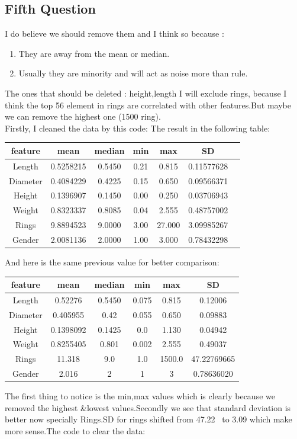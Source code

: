 \documentclass{article}
\begin{document}
\begin{multicols*}{2}
{\centering \section*{Fifth Question}}
I do believe we should remove them and I think so because :
\begin{enumerate}
	\item They are away from the mean or median.
	\item Usually they are minority and will act as noise more than rule.
\end{enumerate}
The ones that should be deleted : height,length I will exclude rings, because I think the top 56 element in rings are correlated with other features.But maybe we can remove the highest one (1500 ring).\\
Firstly, I cleaned the data by this code:
The result in the following table:\\
\begin{tabular}{|c|c|c|c|c|c|c|}
	\hline
feature&mean&median&min&max&SD\\
\hline
Length&0.5258215&0.5450&0.21&0.815&0.11577628\\
\hline
Diameter&0.4084229&0.4225&0.15&0.650&0.09566371\\
\hline
Height&0.1396907&0.1450&0.00&0.250&0.03706943\\
\hline
Weight&0.8323337&0.8085&0.04&2.555&0.48757002\\
\hline
Rings&9.8894523&9.0000&3.00&27.000&3.09985267\\
\hline
Gender&2.0081136&2.0000&1.00&3.000&0.78432298\\
\hline
\end{tabular}
And here is the same previous value for better comparison:\\
 \begin{tabular}{|c|c|c|c|c|c|}
 	\hline
 	feature&mean&median&min&max&SD\\
 	\hline
 	Length&0.52276&0.5450&0.075&0.815&0.12006\\
 	\hline
 	Diameter&0.405955&0.42&0.055&0.650&0.09883\\
 	\hline
 	Height&0.1398092&0.1425&0.0&1.130&0.04942\\
 	\hline
 	Weight&0.8255405&0.801&0.002&2.555&0.49037\\
 	\hline
 	Rings&11.318&9.0&1.0&1500.0&47.22769665\\
 	\hline
 	Gender&2.016&2&1&3&0.78636020\\
 	\hline
 \end{tabular}
 The first thing to notice is the min,max values which is clearly because we removed the highest \&lowest values.Secondly we see that standard deviation is better now specially Rings.SD for rings shifted from 47.22~ to 3.09 which make more sense.The code to clear the data:

\end{multicols*}
\end{document}
